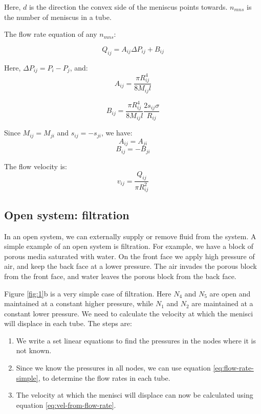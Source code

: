\documentclass[
	12pt
] {article}
\begin{document}
	Here, $d$ is the direction the convex side of the meniscus points towards. $n_{mns}$ is the number of meniscus in a tube.
	
	The flow rate equation of any $n_{mns}$:
	
	\begin{equation} \label{eq:flow-rate-simple}
		Q_{ij} = A_{ij}\Delta P_{ij} + B_{ij}
	\end{equation}
	
	Here, $\Delta P_{ij} = P_i - P_j$, and:
	\begin{equation} \label{eq:flow-rate-aij}
		A_{ij} = \frac{\pi R_{ij}^4}{8M_{ij}l}
	\end{equation}
	
	\begin{equation} \label{eq:flow-rate-bij}
		B_{ij} = \frac{\pi R_{ij}^4}{8M_{ij}l} \frac{2 s_{ij} \sigma}{R_{ij}}
	\end{equation}
	
	
	Since $M_{ij} = M_{ji}$ and $s_{ij} = -s_{ji}$, we have:
	\begin{equation}
		A_{ij} = A_{ji}
	\end{equation}
	\begin{equation}
		B_{ij} = -B_{ji}
	\end{equation}
	
	The flow velocity is:
	\begin{equation} \label{eq:vel-from-flow-rate}
		v_{ij} = \frac{ Q_{ij} }{\pi R_{ij}^2}
	\end{equation}
	
\subsection{Open system: filtration}
	In an open system, we can externally supply or remove fluid from the system. A simple example of an open system is filtration. For example, we have a block of porous media saturated with water. On the front face we apply high pressure of air, and keep the back face at a lower pressure. The air invades the porous block from the front face, and water leaves the porous block from the back face. 
	
	Figure \ref{fig:1}b is a very simple case of filtration. Here $N_4$ and $N_5$ are open and maintained at a constant higher pressure, while $N_1$ and $N_2$ are maintained at a constant lower pressure. We need to calculate the velocity at which the menisci will displace in each tube. The steps are:
	
	\begin{enumerate}
		\item We write a set linear equations to find the pressures in the nodes where it is not known.\item Since we know the pressures in all nodes, we can use equation \ref{eq:flow-rate-simple}, to determine the flow rates in each tube.
		\item The velocity at which the menisci will displace can now be calculated using equation \ref{eq:vel-from-flow-rate}.
	\end{enumerate}
		
\end{document}
